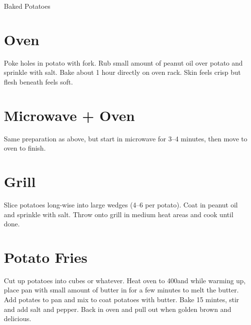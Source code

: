 
\begin{recipe}{Baked Potatoes}
  \yield{}
  \servings{}
  \maketitle

  \section{Oven}
  Poke holes in potato with fork. Rub small amount of peanut oil over
  potato and sprinkle with salt. Bake about 1 hour 
  directly on oven rack. Skin feels crisp but flesh beneath feels soft.

  \section{Microwave + Oven}
  Same preparation as above, but start in microwave for 3--4 minutes, then
  move to oven to finish.

  \section{Grill}
  Slice potatoes long-wise into large wedges (4--6 per potato). Coat in
  peanut oil and sprinkle with salt. Throw onto grill in medium heat areas
  and cook until done.

  \section{Potato Fries}
  Cut up potatoes into cubes or whatever. Heat oven to 400\degF and while
  warming up, place pan with small amount of butter in for a few minutes to
  melt the butter. Add potates to pan and mix to coat potatoes with butter.
  Bake 15 mintes, stir and add salt and pepper. Back in oven and pull out
  when golden brown and delicious.

\end{recipe}

